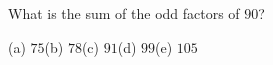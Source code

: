 What is the sum of the odd factors of $90$?

(a) $75$\quad (b) $78$\quad (c) $91$\quad (d) $99$\quad (e) $105$
